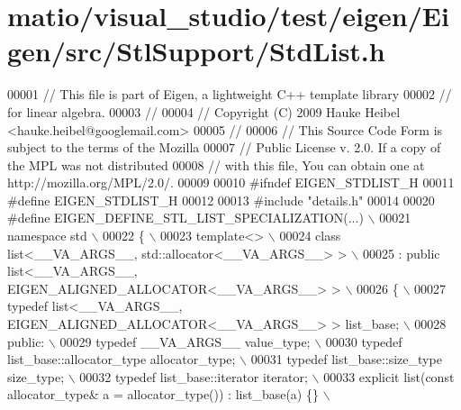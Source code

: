 \hypertarget{matio_2visual__studio_2test_2eigen_2_eigen_2src_2_stl_support_2_std_list_8h_source}{}\section{matio/visual\+\_\+studio/test/eigen/\+Eigen/src/\+Stl\+Support/\+Std\+List.h}
\label{matio_2visual__studio_2test_2eigen_2_eigen_2src_2_stl_support_2_std_list_8h_source}

\begin{DoxyCode}
00001 \textcolor{comment}{// This file is part of Eigen, a lightweight C++ template library}
00002 \textcolor{comment}{// for linear algebra.}
00003 \textcolor{comment}{//}
00004 \textcolor{comment}{// Copyright (C) 2009 Hauke Heibel <hauke.heibel@googlemail.com>}
00005 \textcolor{comment}{//}
00006 \textcolor{comment}{// This Source Code Form is subject to the terms of the Mozilla}
00007 \textcolor{comment}{// Public License v. 2.0. If a copy of the MPL was not distributed}
00008 \textcolor{comment}{// with this file, You can obtain one at http://mozilla.org/MPL/2.0/.}
00009 
00010 \textcolor{preprocessor}{#ifndef EIGEN\_STDLIST\_H}
00011 \textcolor{preprocessor}{#define EIGEN\_STDLIST\_H}
00012 
00013 \textcolor{preprocessor}{#include "details.h"}
00014 
00020 \textcolor{preprocessor}{#define EIGEN\_DEFINE\_STL\_LIST\_SPECIALIZATION(...) \(\backslash\)}
00021 \textcolor{preprocessor}{namespace std \(\backslash\)}
00022 \textcolor{preprocessor}{\{ \(\backslash\)}
00023 \textcolor{preprocessor}{  template<> \(\backslash\)}
00024 \textcolor{preprocessor}{  class list<\_\_VA\_ARGS\_\_, std::allocator<\_\_VA\_ARGS\_\_> >           \(\backslash\)}
00025 \textcolor{preprocessor}{    : public list<\_\_VA\_ARGS\_\_, EIGEN\_ALIGNED\_ALLOCATOR<\_\_VA\_ARGS\_\_> > \(\backslash\)}
00026 \textcolor{preprocessor}{  \{ \(\backslash\)}
00027 \textcolor{preprocessor}{    typedef list<\_\_VA\_ARGS\_\_, EIGEN\_ALIGNED\_ALLOCATOR<\_\_VA\_ARGS\_\_> > list\_base; \(\backslash\)}
00028 \textcolor{preprocessor}{  public: \(\backslash\)}
00029 \textcolor{preprocessor}{    typedef \_\_VA\_ARGS\_\_ value\_type; \(\backslash\)}
00030 \textcolor{preprocessor}{    typedef list\_base::allocator\_type allocator\_type; \(\backslash\)}
00031 \textcolor{preprocessor}{    typedef list\_base::size\_type size\_type;  \(\backslash\)}
00032 \textcolor{preprocessor}{    typedef list\_base::iterator iterator;  \(\backslash\)}
00033 \textcolor{preprocessor}{    explicit list(const allocator\_type& a = allocator\_type()) : list\_base(a) \{\}  \(\backslash\)}

\end{DoxyCode}
